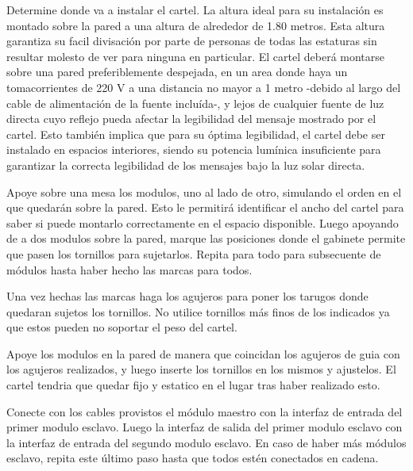 

Determine donde va a instalar el cartel. La altura ideal para su instalación es montado sobre la pared a una altura de alrededor de 1.80 metros. Esta altura garantiza su facil divisación por parte de personas de todas las estaturas sin resultar molesto de ver para ninguna en particular. El cartel deberá montarse sobre una pared preferiblemente despejada, en un area donde haya un tomacorrientes de 220 V a una distancia no mayor a 1 metro -debido al largo del cable de alimentación de la fuente incluída-, y lejos de cualquier fuente de luz directa cuyo reflejo pueda afectar la legibilidad del mensaje mostrado por el cartel. Esto también implica que para su óptima legibilidad, el cartel debe ser instalado en espacios interiores, siendo su potencia lumínica insuficiente para garantizar la correcta legibilidad de los mensajes bajo la luz solar directa.



Apoye sobre una mesa los modulos, uno al lado de otro, simulando el orden en el que quedarán sobre la pared. Esto le permitirá identificar el ancho del cartel para saber si puede montarlo correctamente en el espacio disponible. Luego apoyando de a dos modulos sobre la pared, marque las posiciones donde el gabinete permite que pasen los tornillos para sujetarlos. Repita para todo para subsecuente de módulos hasta haber hecho las marcas para todos.




Una vez hechas las marcas haga los agujeros para poner los tarugos donde quedaran sujetos los tornillos. No utilice tornillos más finos de los indicados ya que estos pueden no soportar el peso del cartel.


Apoye los modulos en la pared de manera que coincidan los agujeros de guia con los agujeros realizados, y luego inserte los tornillos en los mismos y ajustelos. El cartel tendria que quedar fijo y estatico en el lugar tras haber realizado esto.


Conecte con los cables provistos el módulo maestro con la interfaz de entrada del primer modulo esclavo. Luego la interfaz de salida del primer modulo esclavo con la interfaz de entrada del segundo modulo esclavo. En caso de haber más módulos esclavo, repita este último paso hasta que todos estén conectados en cadena.

